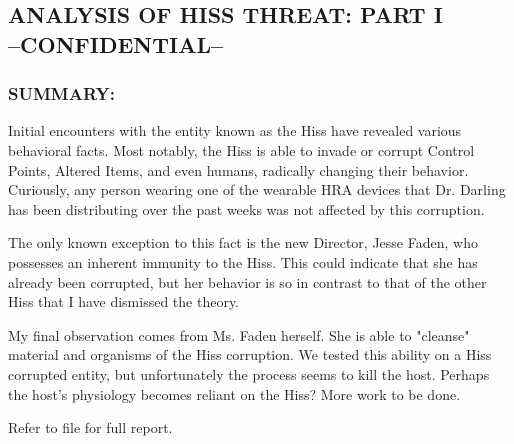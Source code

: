 \subsection*{ANALYSIS OF HISS THREAT: PART I\\
	--CONFIDENTIAL--}
\subsubsection*{SUMMARY:}
\par Initial encounters with the entity known as the Hiss have revealed
various behavioral facts. Most notably, the Hiss is able to invade or
corrupt Control Points, Altered Items, and even humans, radically
changing their behavior. Curiously, any person wearing one of the
wearable HRA devices that Dr. Darling has been distributing over
the past weeks was not affected by this corruption.
\par The only known exception to this fact is the new Director, Jesse
Faden, who possesses an inherent immunity to the Hiss. This
could indicate that she has already been corrupted, but her
behavior is so in contrast to that of the other Hiss that I have
dismissed the theory.
\par My final observation comes from Ms. Faden herself. She is able to
"cleanse" material and organisms of the Hiss corruption. We
tested this ability on a Hiss corrupted entity, but unfortunately the
process seems to kill the host. Perhaps the host's physiology
becomes reliant on the Hiss? More work to be done.
\par Refer to file  for full report.